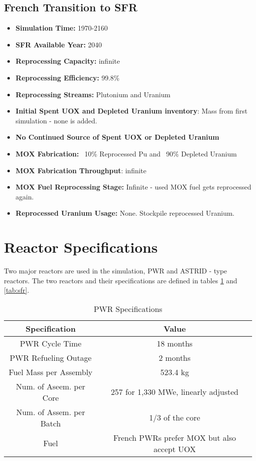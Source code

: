 \subsection{French Transition to \gls{SFR}}
\begin{itemize}
	\item \textbf{Simulation Time:}  1970-2160
	\item \textbf{\gls{SFR} Available Year:} 2040
	\item \textbf{Reprocessing Capacity:}  infinite 
	\item \textbf{Reprocessing Efficiency:}  99.8\%  
	\item \textbf{Reprocessing Streams:} Plutonium and Uranium
	\item \textbf{Initial Spent \gls{UOX} and Depleted Uranium inventory}: Mass from first simulation - none is added.
	\item \textbf{No Continued Source of Spent \gls{UOX} or Depleted Uranium}  
	\item \textbf{\gls{MOX} Fabrication:}  ~10\% Reprocessed Pu and ~90\% Depleted Uranium  
	\item \textbf{\gls{MOX} Fabrication Throughput}: infinite
	\item \textbf{\gls{MOX} Fuel Reprocessing Stage:}  Infinite - used \gls{MOX} fuel gets reprocessed again.  
	\item\textbf{Reprocessed Uranium Usage:}  None. Stockpile reprocessed Uranium. \\
\end{itemize}

\section{Reactor Specifications}
Two major reactors are used in the simulation, \gls{PWR} and ASTRID - type reactors.
The two reactors and their specifications are defined in tables \ref{tab:pwr} and \ref{tab:sfr}.

\begin{table}[h]
	\centering
	\label{tab:pwr}
	\begin{tabular}{|c|c|}
		\hline
		Specification & Value \\
		\hline
		PWR Cycle Time & 18 months \\ 
		PWR Refueling Outage & 2 months \\
		Fuel Mass per Assembly & 523.4 kg \\
		Num. of Aseem. per Core & 257 for 1,330 MWe, linearly adjusted\\
		Num. of Assem. per Batch & 1/3 of the core \\
		Fuel & French \glspl{PWR} prefer \gls{MOX} but also accept \gls{UOX}\\
		\hline
	\end{tabular}
	\caption {\gls{PWR} Specifications}
	\end{table}
	
